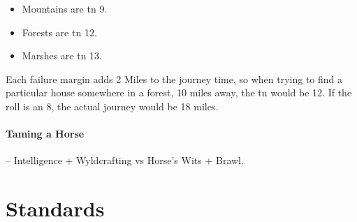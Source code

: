 \begin{multicols}{2}
\begin{itemize}
  \item
    Mountains are \gls{tn} 9.
  \item
    Forests are \gls{tn} 12.
  \item
    Marshes are \gls{tn} 13.

\end{itemize}

Each failure margin adds 2 Miles to the journey time, so when trying to find a particular house somewhere in a forest, 10 miles away, the \gls{tn} would be 12.
If the roll is an 8, the actual journey would be 18 miles.

\paragraph{Taming a Horse} -- Intelligence + Wyldcrafting vs Horse's Wits + Brawl.

\end{multicols}

\section{Standards}

